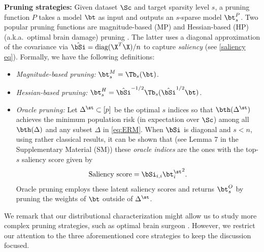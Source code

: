 \vp
\noindent \textbf{Pruning strategies:} Given dataset $\Sc$ and target sparsity level $s$, a pruning function $P$ takes a model $\bt$ as input and outputs an $s$-sparse model $\bt^P_s$. Two popular pruning functions are magnitude-based (MP) and Hessian-based (HP) (a.k.a.~optimal brain damage) pruning \cite{lecun1990optimal}. The latter uses a diagonal approximation of the covariance via $\hat{\bSi}=\text{diag}(\X^T\X)/n$ to capture \emph{saliency} (see \eqref{saliency eq}). Formally, we have the following definitions:
\begin{itemize}
\item {\em{Magnitude-based pruning:}} $\bt^M_s=\Tb_s(\bt)$.
\item {\em{Hessian-based pruning:}} $\bt^H_s=\hat{\bSi}^{-1/2}\Tb_s(\hat{\bSi}^{1/2}\bt)$.
\item {\em{Oracle pruning:}} Let $\Delta^\st\subset[p]$ be the optimal $s$ indices so that $\bth(\Delta^\st)$ achieves the minimum population risk (in expectation over $\Sc$) among all $\bth(\Delta)$ and any subset $\Delta$ in \eqref{eq:ERM}.  When $\bSi$ is diagonal and $s<n$, using rather classical results, it can be shown that (see Lemma 7 in the Supplementary Material (SM)) these {\em{oracle indices}} are the ones with the top-$s$ saliency score given by %
\begin{align}
\text{Saliency score}=\bSi_{i,i}{\bt^\st_i}^2.\label{saliency eq}
\end{align} Oracle pruning {employs these latent saliency scores and} returns $\bt^O_s$ by pruning the weights of $\bt$ outside of $\Delta^\st$.
\end{itemize}
We remark that our distributional characterization might allow us to study more complex pruning strategies, such as optimal brain surgeon \cite{hassibi1994optimal}. However, we restrict our attention to the three aforementioned core strategies to keep the discussion focused. 

